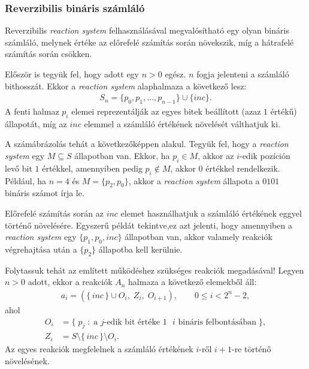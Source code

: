 \documentclass[12pt]{article}
\theoremstyle{definition}
\theoremstyle{remark}
\theoremstyle{plain}
\begin{document}
    \subsubsection*{Reverzibilis bináris számláló}

    Reverzibilis \textit{reaction system} felhasználásával megvalósítható egy olyan bináris számláló, melynek értéke az előrefelé számítás során növekszik, míg a hátrafelé számítás során csökken.

    Először is tegyük fel, hogy adott egy $n > 0$ egész. $n$ fogja jelenteni a számláló bithosszát. Ekkor a \textit{reaction system} alaphalmaza a következő lesz:
    \begin{align*}
        S_{n} = \{ p_{0}, p_{1}, \ldots, p_{n - 1}\} \cup \{ \textit{inc} \}.
    \end{align*}
    A fenti halmaz $p_{i}$ elemei reprezentálják az egyes bitek beállított (azaz $1$ értékű) állapotát, míg az $\textit{inc}$ elemmel a számláló értékének növelését válthatjuk ki.

    A számábrázolás tehát a következőképpen alakul. Tegyük fel, hogy a \textit{reaction system} egy $M \subseteq S$ állapotban van. Ekkor, ha $p_{i} \in M$, akkor az $i$-edik pozíción levő bit $1$ értékkel, amennyiben pedig $p_{i} \notin M$, akkor $0$ értékkel rendelkezik. Például, ha $n = 4$ és $M = \{p_{2}, p_{0}\}$, akkor a \textit{reaction system} állapota a $0101$ bináris számot írja le.
    
    Előrefelé számítás során az $\textit{inc}$ elemet használhatjuk a számláló értékének eggyel történő növelésére. Egyszerű példát tekintve,ez azt jelenti, hogy amennyiben a \textit{reaction system} egy $\{p_{1}, p_{0}, \textit{inc}\}$ állapotban van, akkor valamely reakciók végrehajtása után a $\{ p_{2} \}$ állapotba kell kerülnie.

    Folytassuk tehát az említett működéshez szükséges reakciók megadásával! Legyen $n > 0$ adott, ekkor a reakciók $A_{n}$ halmaza a következő elemekből áll:
    \begin{align*}
        a_{i} = (\{ \, \textit{inc} \, \} \cup O_{i}, \; Z_{i}, \; O_{i + 1}), \qquad 0 \leq i < 2^{n} - 2,
    \end{align*}
    ahol
    \begin{align*}
        O_{i} &= \{ \; p_{j} \; : \; \text{a $j$-edik bit értéke $1$ $i$ bináris felbontásában} \; \}, \\
        Z_{i} &= S \setminus\{ \, \textit{inc} \, \} \setminus O_{i}.
    \end{align*}
    Az egyes reakciók megfelelnek a számláló értékének $i$-ről $i + 1$-re történő növelésének.
\end{document}

